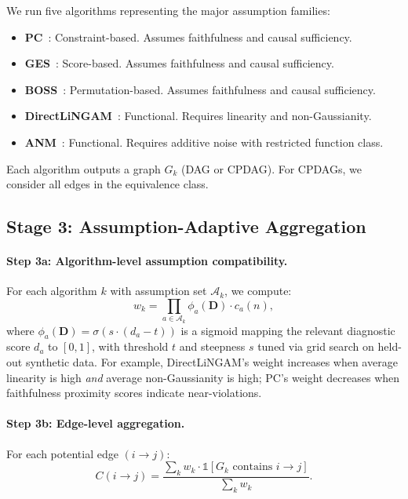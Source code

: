 \documentclass{article}
\begin{document}
We run five algorithms representing the major assumption families:
\begin{itemize}
    \item \textbf{PC}~\citep{spirtes2000causation}: Constraint-based. Assumes faithfulness and causal sufficiency.
    \item \textbf{GES}~\citep{chickering2002optimal}: Score-based. Assumes faithfulness and causal sufficiency.
    \item \textbf{BOSS}~\citep{andrews2023boss}: Permutation-based. Assumes faithfulness and causal sufficiency.
    \item \textbf{DirectLiNGAM}~\citep{shimizu2006lingam}: Functional. Requires linearity and non-Gaussianity.
    \item \textbf{ANM}~\citep{hoyer2008nonlinear}: Functional. Requires additive noise with restricted function class.
\end{itemize}
Each algorithm outputs a graph $G_k$ (DAG or CPDAG). For CPDAGs, we consider all edges in the equivalence class.

\subsection{Stage 3: Assumption-Adaptive Aggregation}

\paragraph{Step 3a: Algorithm-level assumption compatibility.} For each algorithm $k$ with assumption set $\mathcal{A}_k$, we compute:
\begin{equation}
    w_k = \prod_{a \in \mathcal{A}_k} \phi_a(\mathbf{D}) \cdot c_a(n),
\end{equation}
where $\phi_a(\mathbf{D}) = \sigma(s \cdot (d_a - t))$ is a sigmoid mapping the relevant diagnostic score $d_a$ to $[0,1]$, with threshold $t$ and steepness $s$ tuned via grid search on held-out synthetic data. For example, DirectLiNGAM's weight increases when average linearity is high \emph{and} average non-Gaussianity is high; PC's weight decreases when faithfulness proximity scores indicate near-violations.

\paragraph{Step 3b: Edge-level aggregation.} For each potential edge $(i \to j)$:
\begin{equation}
    C(i \to j) = \frac{\sum_k w_k \cdot \mathbb{1}[G_k \text{ contains } i \to j]}{\sum_k w_k}.
\end{equation}
\end{document}
